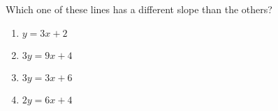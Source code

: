 \bigskip

\item Which one of these lines has a different slope than the others? 

\begin{enumerate}
\item $y = 3x + 2$
\item $3y = 9x + 4$
\item $3y = 3x + 6$
\item $2y = 6x + 4$
\end{enumerate}

